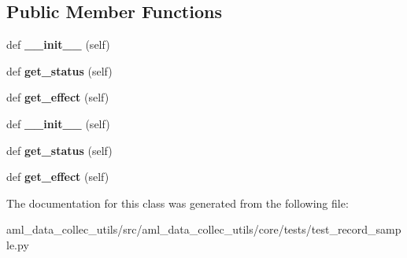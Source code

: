 \subsection*{Public Member Functions}
\begin{DoxyCompactItemize}
\item 
\hypertarget{classtest__record__sample_1_1_dummy_task_interface_ae65615d7e6bf3cabcbaa38c704ad3e8e}{}\label{classtest__record__sample_1_1_dummy_task_interface_ae65615d7e6bf3cabcbaa38c704ad3e8e} 
def {\bfseries \+\_\+\+\_\+init\+\_\+\+\_\+} (self)
\item 
\hypertarget{classtest__record__sample_1_1_dummy_task_interface_a5f30dff815bef801f930219a68e01a34}{}\label{classtest__record__sample_1_1_dummy_task_interface_a5f30dff815bef801f930219a68e01a34} 
def {\bfseries get\+\_\+status} (self)
\item 
\hypertarget{classtest__record__sample_1_1_dummy_task_interface_abb169f22038abe7de80434e898d219e3}{}\label{classtest__record__sample_1_1_dummy_task_interface_abb169f22038abe7de80434e898d219e3} 
def {\bfseries get\+\_\+effect} (self)
\item 
\hypertarget{classtest__record__sample_1_1_dummy_task_interface_ae65615d7e6bf3cabcbaa38c704ad3e8e}{}\label{classtest__record__sample_1_1_dummy_task_interface_ae65615d7e6bf3cabcbaa38c704ad3e8e} 
def {\bfseries \+\_\+\+\_\+init\+\_\+\+\_\+} (self)
\item 
\hypertarget{classtest__record__sample_1_1_dummy_task_interface_a5f30dff815bef801f930219a68e01a34}{}\label{classtest__record__sample_1_1_dummy_task_interface_a5f30dff815bef801f930219a68e01a34} 
def {\bfseries get\+\_\+status} (self)
\item 
\hypertarget{classtest__record__sample_1_1_dummy_task_interface_abb169f22038abe7de80434e898d219e3}{}\label{classtest__record__sample_1_1_dummy_task_interface_abb169f22038abe7de80434e898d219e3} 
def {\bfseries get\+\_\+effect} (self)
\end{DoxyCompactItemize}


The documentation for this class was generated from the following file\+:\begin{DoxyCompactItemize}
\item 
aml\+\_\+data\+\_\+collec\+\_\+utils/src/aml\+\_\+data\+\_\+collec\+\_\+utils/core/tests/test\+\_\+record\+\_\+sample.\+py\end{DoxyCompactItemize}
